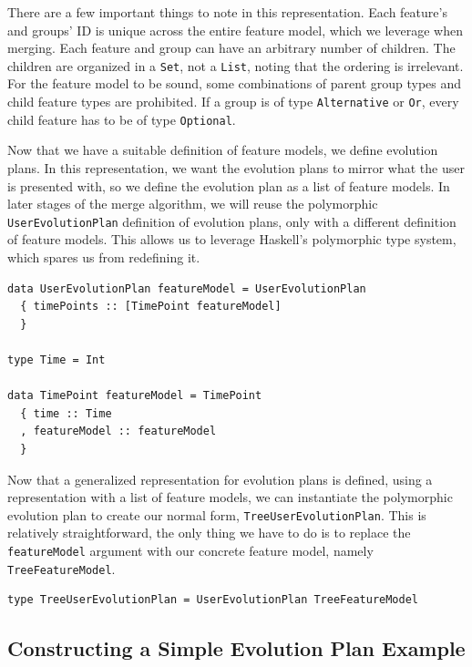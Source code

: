 \documentclass[a4paper,english]{ifimaster}
\begin{document}
There are a few important things to note in this representation. Each feature's and groups' ID is unique across the entire feature model, which we leverage when merging. Each feature and group can have an arbitrary number of children. The children are organized in a \texttt{Set}, not a \texttt{List}, noting that the ordering is irrelevant. For the feature model to be sound, some combinations of parent group types and child feature types are prohibited. If a group is of type \texttt{Alternative} or \texttt{Or}, every child feature has to be of type \texttt{Optional}.

Now that we have a suitable definition of feature models, we define evolution plans. In this representation, we want the evolution plans to mirror what the user is presented with, so we define the evolution plan as a list of feature models. In later stages of the merge algorithm, we will reuse the polymorphic \texttt{User\-Evolution\-Plan} definition of evolution plans, only with a different definition of feature models. This allows us to leverage Haskell's polymorphic type system, which spares us from redefining it.

\begin{verbatim}
data UserEvolutionPlan featureModel = UserEvolutionPlan
  { timePoints :: [TimePoint featureModel]
  }

type Time = Int

data TimePoint featureModel = TimePoint
  { time :: Time
  , featureModel :: featureModel
  }
\end{verbatim}

Now that a generalized representation for evolution plans is defined, using a representation with a list of feature models, we can instantiate the polymorphic evolution plan to create our normal form, \texttt{Tree\-User\-Evolution\-Plan}. This is relatively straightforward, the only thing we have to do is to replace the \texttt{featureModel} argument with our concrete feature model, namely \texttt{Tree\-Feature\-Model}.

\begin{verbatim}
type TreeUserEvolutionPlan = UserEvolutionPlan TreeFeatureModel
\end{verbatim}

\subsection{Constructing a Simple Evolution Plan Example}%
\label{sub:constructing_a_simple_evolution_plan_example}
\end{document}
